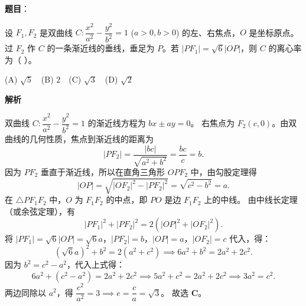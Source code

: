 \begin{answer}

\textbf{题目}：

设 $F_1, F_2$ 是双曲线 $C: \dfrac{x^2}{a^2} - \dfrac{y^2}{b^2} = 1$ ($a > 0, b > 0$) 的左、右焦点，$O$ 是坐标原点。过 $F_2$ 作 $C$ 的一条渐近线的垂线，垂足为 $P$。若 $|PF_1| = \sqrt6|OP|$，则 $C$ 的离心率为（ ）。

(A) $\sqrt5$　(B) $2$　(C) $\sqrt3$　(D) $\sqrt2$

\textbf{解析}

双曲线 $C: \dfrac{x^2}{a^2} - \dfrac{y^2}{b^2} = 1$ 的渐近线方程为 $bx \pm ay = 0$。
右焦点为 $F_2(c, 0)$。由双曲线的几何性质，焦点到渐近线的距离为
\nopagebreak[4]
\[|PF_2| = \dfrac{|bc|}{\sqrt{a^2 + b^2}} = \dfrac{bc}{c} = b.\]
因为 $PF_2$ 垂直于渐近线，所以在直角三角形 $OPF_2$ 中，由勾股定理得
\nopagebreak[4]
\[|OP| = \sqrt{|OF_2|^2 - |PF_2|^2} = \sqrt{c^2 - b^2} = a.\]
在 $\triangle PF_1F_2$ 中，$O$ 为 $F_1F_2$ 的中点，即 $PO$ 是边 $F_1F_2$ 上的中线。
由中线长定理（或余弦定理），有
\nopagebreak[4]
\[|PF_1|^2 + |PF_2|^2 = 2(|OP|^2 + |OF_2|^2).\]
将 $|PF_1| = \sqrt6|OP| = \sqrt6 a$，$|PF_2| = b$，$|OP| = a$，$|OF_2| = c$ 代入，得：
\nopagebreak[4]
\[(\sqrt6 a)^2 + b^2 = 2(a^2 + c^2) \implies 6a^2 + b^2 = 2a^2 + 2c^2.\]
因为 $b^2 = c^2 - a^2$，代入上式得：
\nopagebreak[4]
\[6a^2 + (c^2 - a^2) = 2a^2 + 2c^2 \implies 5a^2 + c^2 = 2a^2 + 2c^2 \implies 3a^2 = c^2.\]
两边同除以 $a^2$，得 $\dfrac{c^2}{a^2} = 3 \implies e = \dfrac{c}{a} = \sqrt3$。
故选 \textbf{C}。


\end{answer}
